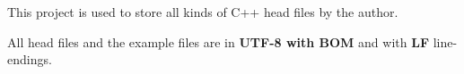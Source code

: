 This project is used to store all kinds of C++ head files by the author.

All head files and the example files are in {\bfseries{U\+T\+F-\/8 with B\+OM}} and with {\bfseries{LF}} line-\/endings. 